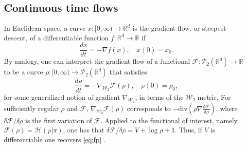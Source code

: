 \documentclass[final,12pt]{colt2018}
\newcommand{\was}{\mathcal{W}}
\begin{document}
\subsection{Continuous time flows}
In Euclidean space, a curve $x:[0,\infty) \to \mathbb{R}^d$ is the gradient flow, or steepest descent, of a differentiable function $f:\mathbb{R}^d \to \mathbb{R}$ if
\begin{equation}\label{eq:grad_flow_euclidean}
\frac{dx}{dt} = -\nabla f(x), \quad {x(0) = x_0}.
\end{equation}
By analogy, one can interpret the gradient flow of a functional $\mathcal{F} :\mathcal{P}_2(\mathbb{R}^d) \to \mathbb{R}$ to be a curve $\rho:[0,\infty) \to \mathcal{P}_2(\mathbb{R}^d)$ that satisfies
\begin{equation}\label{eq:grad_flow_wasserstein}
\frac{d\rho}{dt} = -\nabla_{\was_2} \mathcal{F}(\rho), \quad {\rho(0) = \rho_0},
\end{equation}
for some generalized notion of gradient $\nabla_{\was_2}$, in terms of the $\was_2$ metric. For sufficiently regular $\rho$ and $\mathcal{F}$, $\nabla_{\was_2} \mathcal{F}(\rho)$ corresponds to  $-\text{div}(\rho \nabla\frac{ \delta\mathcal{F}}{\delta \rho})$, where $\delta\mathcal{F} /\delta \rho$ is the first variation of $\mathcal{F}$. Applied to the functional of interest, namely $\mathcal{F}(\rho) = \mathcal{H}(\rho | \pi)$, one has that $\delta\mathcal{F} /\delta \rho = V + \log \rho + 1$. Thus, if $V$ is differentiable one recovers \eqref{eq:fp} \citep[see e.g.][Lemma 10.4.1]{ambrosio2005}.
\end{document}
